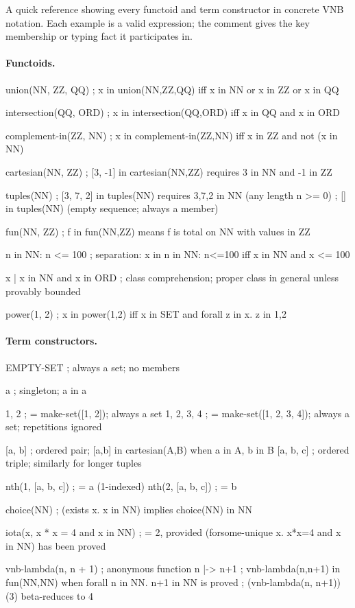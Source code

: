 \documentclass{amsbook}[openany]
\theoremstyle{definition}
\theoremstyle{remark}
\theoremstyle{remark}
\begin{document}
A quick reference showing every functoid and term constructor in concrete
VNB notation.  Each example is a valid expression; the comment gives the
key membership or typing fact it participates in.

\paragraph{Functoids.}
\begin{VNBsnip}
union(NN, ZZ, QQ)
; x in union(NN,ZZ,QQ)  iff  x in NN or x in ZZ or x in QQ

intersection(QQ, ORD)
; x in intersection(QQ,ORD)  iff  x in QQ and x in ORD

complement-in(ZZ, NN)
; x in complement-in(ZZ,NN)  iff  x in ZZ and not (x in NN)

cartesian(NN, ZZ)
; [3, -1] in cartesian(NN,ZZ)   requires  3 in NN  and  -1 in ZZ

tuples(NN)
; [3, 7, 2] in tuples(NN)   requires  3,7,2 in NN   (any length n >= 0)
; []        in tuples(NN)   (empty sequence; always a member)

fun(NN, ZZ)
; f in fun(NN,ZZ)  means f is total on NN with values in ZZ

{n in NN: n <= 100}
; separation: x in {n in NN: n<=100}  iff  x in NN and x <= 100

{x | x in NN and x in ORD}
; class comprehension; proper class in general unless provably bounded

power({1, 2})
; x in power({1,2})  iff  x in SET  and  forall z in x. z in {1,2}

\end{VNBsnip}

\paragraph{Term constructors.}
\begin{VNBsnip}
EMPTY-SET
; always a set; no members

{a}
; singleton; a in {a}

{1, 2}        ; = make-set([1, 2]); always a set
{1, 2, 3, 4}  ; = make-set([1, 2, 3, 4]); always a set; repetitions ignored

[a, b]        ; ordered pair; [a,b] in cartesian(A,B) when a in A, b in B
[a, b, c]     ; ordered triple; similarly for longer tuples

nth(1, [a, b, c])   ; = a    (1-indexed)
nth(2, [a, b, c])   ; = b

choice(NN)
; (exists x. x in NN) implies choice(NN) in NN

iota(x, x * x = 4 and x in NN)
; = 2, provided (forsome-unique x. x*x=4 and x in NN) has been proved

vnb-lambda(n, n + 1)
; anonymous function  n |-> n+1
; vnb-lambda(n,n+1) in fun(NN,NN)  when  forall n in NN. n+1 in NN  is proved
; (vnb-lambda(n, n+1))(3)  beta-reduces to  4
\end{VNBsnip}
\end{document}
